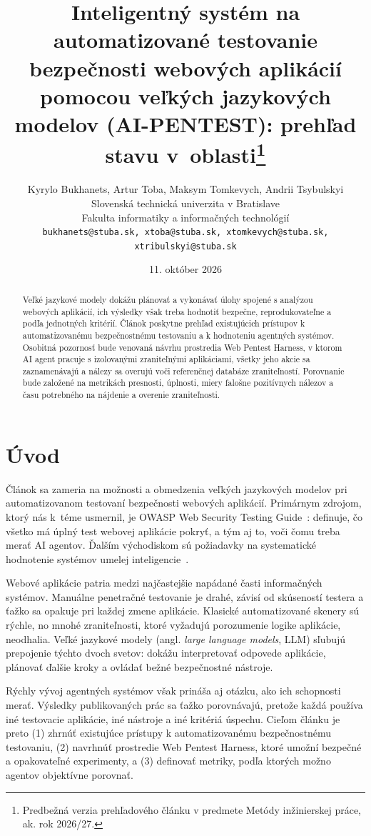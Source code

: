 \documentclass[10pt,twoside,slovak,a4paper]{article}
\title{Inteligentný systém na automatizované testovanie bezpečnosti webových aplikácií pomocou veľkých jazykových modelov (AI-PENTEST): prehľad stavu v~oblasti\thanks{Predbežná verzia prehľadového článku v predmete Metódy inžinierskej práce, ak. rok 2026/27.}}
\author{
Kyrylo Bukhanets, Artur Toba, Maksym Tomkevych, Andrii Tsybulskyi\\[2pt]
{\small Slovenská technická univerzita v Bratislave}\\
{\small Fakulta informatiky a informačných technológií}\\
{\small \texttt{bukhanets@stuba.sk, xtoba@stuba.sk, xtomkevych@stuba.sk, xtribulskyi@stuba.sk}}
}
\date{\small 11. október 2026}
\begin{document}
\maketitle

\begin{abstract}
Veľké jazykové modely dokážu plánovať a vykonávať úlohy spojené s analýzou webových aplikácií, ich výsledky však treba hodnotiť bezpečne, reprodukovateľne a podľa jednotných kritérií. Článok poskytne prehľad existujúcich prístupov k automatizovanému bezpečnostnému testovaniu a k hodnoteniu agentných systémov. Osobitná pozornosť bude venovaná návrhu prostredia Web Pentest Harness, v ktorom AI agent pracuje s izolovanými zraniteľnými aplikáciami, všetky jeho akcie sa zaznamenávajú a nálezy sa overujú voči referenčnej databáze zraniteľností. Porovnanie bude založené na metrikách presnosti, úplnosti, miery falošne pozitívnych nálezov a času potrebného na nájdenie a overenie zraniteľnosti.
\end{abstract}

\section{Úvod}\label{uvod}
Článok sa zameria na možnosti a obmedzenia veľkých jazykových modelov pri automatizovanom testovaní bezpečnosti webových aplikácií. Primárnym zdrojom, ktorý nás k~téme usmernil, je OWASP Web Security Testing Guide~\cite{OWASP-WSTG}: definuje, čo všetko má úplný test webovej aplikácie pokryť, a tým aj to, voči čomu treba merať AI agentov. Ďalším východiskom sú požiadavky na systematické hodnotenie systémov umelej inteligencie~\cite{NIST-AIME,NIST-ARIA}.

Webové aplikácie patria medzi najčastejšie napádané časti informačných systémov. Manuálne penetračné testovanie je drahé, závisí od skúseností testera a ťažko sa opakuje pri každej zmene aplikácie. Klasické automatizované skenery sú rýchle, no mnohé zraniteľnosti, ktoré vyžadujú porozumenie logike aplikácie, neodhalia. Veľké jazykové modely (angl. \emph{large language models}, LLM) sľubujú prepojenie týchto dvoch svetov: dokážu interpretovať odpovede aplikácie, plánovať ďalšie kroky a ovládať bežné bezpečnostné nástroje.

Rýchly vývoj agentných systémov však prináša aj otázku, ako ich schopnosti merať. Výsledky publikovaných prác sa ťažko porovnávajú, pretože každá používa iné testovacie aplikácie, iné nástroje a iné kritériá úspechu. Cieľom článku je preto (1) zhrnúť existujúce prístupy k automatizovanému bezpečnostnému testovaniu, (2) navrhnúť prostredie Web Pentest Harness, ktoré umožní bezpečné a opakovateľné experimenty, a (3) definovať metriky, podľa ktorých možno agentov objektívne porovnať.
\end{document}

